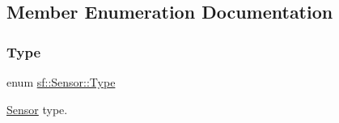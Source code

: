 \subsection{Member Enumeration Documentation}
\mbox{\label{classsf_1_1_sensor_a687375af3ab77b818fca73735bcaea84}} 
\subsubsection{\texorpdfstring{Type}{Type}}
{\footnotesize\ttfamily enum \mbox{\hyperlink{classsf_1_1_sensor_a687375af3ab77b818fca73735bcaea84}{sf\+::\+Sensor\+::\+Type}}}



\mbox{\hyperlink{classsf_1_1_sensor}{Sensor}} type. 


